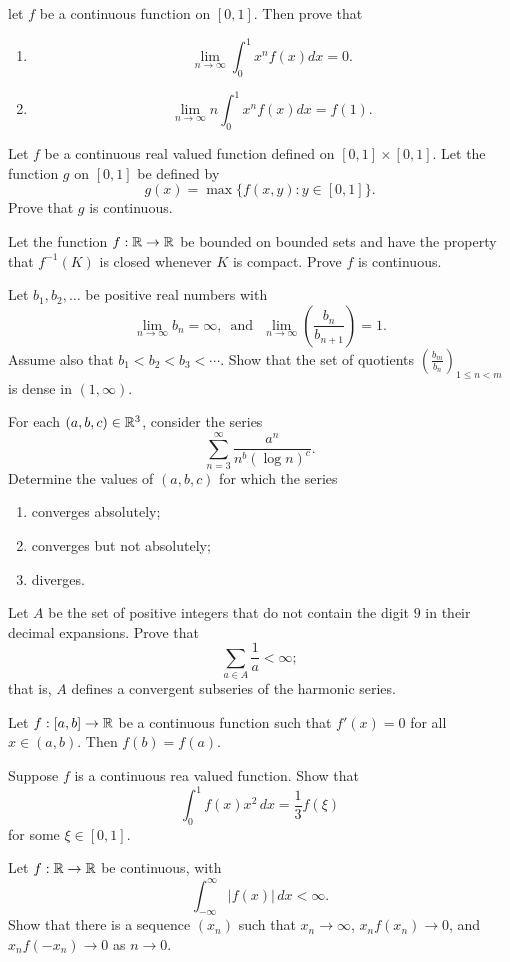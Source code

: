 \question[Fa81] let $f$ be a continuous function on $[0,1]$. Then prove that
\begin{enumerate}
    \item $$\lim_{n\to\infty}{\int_{0}^{1}{x^nf(x)dx}}=0.$$
    \item $$\lim_{n\to\infty}{n\int_{0}^{1}{x^nf(x)dx}}=f(1).$$
\end{enumerate}

\question[Sp89] Let $f$ be a continuous real valued function defined on $[0,1]\times[0,1]$. Let the function $g$ on $[0,1]$ be defined by
$$g(x)=\max\{f(x,y): y\in[0,1]\}.$$
Prove that $g$ is continuous.

\question[Fa01] Let the function $f:\mathbb{R}\to\mathbb{R}$ be bounded on bounded sets and have the property that $f^{-1}(K)$ is closed whenever $K$ is compact. Prove $f$ is continuous.

\question[Su83] Let $b_1, b_2,\ldots$ be positive real numbers with
$$\lim_{n\to\infty}{b_n}=\infty,\,\,\,\text{and}\,\,\,\,\lim_{n\to\infty}{\left(\frac{b_n}{b_{n+1}}\right)}=1.$$
Assume also that $b_1<b_2<b_3<\cdots$. Show that the set of quotients $\left(\frac{b_m}{b_n}\right)_{1\leq n<m}$ is dense in $(1,\infty)$.

\question[Su80, Sp97] For each $(a,b,c)\in\mathbb{R}^3$, consider the series
$$\sum_{n=3}^{\infty}{\frac{a^n}{n^b(\log{n})^c}}.$$
Determine the values of $(a,b,c)$ for which the series
\begin{enumerate}
    \item converges absolutely;
    \item converges but not absolutely;
    \item diverges.
\end{enumerate}

\question[Sp91] Let $A$ be the set of positive integers that do not contain the digit $9$ in their decimal expansions. Prove that $$\sum_{a\in A}{\frac{1}{a}}<\infty;$$
that is, $A$ defines a convergent subseries of the harmonic series.

\question[Su83] Let $f:[a,b]\to\mathbb{R}$ be a continuous function such that $f'(x)=0$ for all $x\in (a,b)$. Then $f(b)=f(a)$.

\question[Fa90] Suppose $f$ is a continuous rea valued function. Show that $$\int_{0}^{1}{f(x)x^2\,dx}=\frac{1}{3}f(\xi)$$
for some $\xi\in[0,1]$.

\question[Su81] Let $f:\mathbb{R}\to\mathbb{R}$ be continuous, with $$\int_{-\infty}^{\infty}{|f(x)|\,dx}<\infty.$$
Show that there is a sequence $(x_n)$ such that $x_n\to\infty$, $x_nf(x_n)\to 0$, and $x_nf(-x_n)\to 0$ as $n\to 0$.

